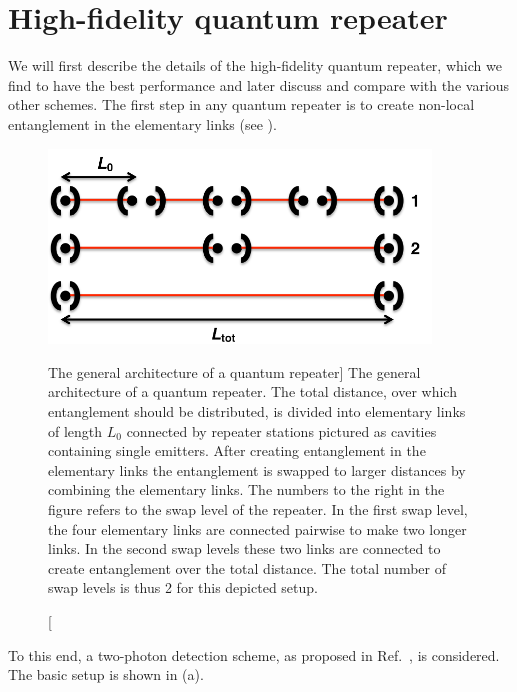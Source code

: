 \section{High-fidelity quantum repeater}  \label{sec:generation}

We will first describe the details of the high-fidelity quantum repeater, which
we find to have the best performance and later discuss and compare with the
various other schemes. The first step in any quantum repeater is to create
non-local entanglement in the elementary links (see ).
\begin{figure} 
\centering
\includegraphics[width=4.0in]{./figs_Borregaard_PRA2015/figure1}
\caption
[The general architecture of a quantum repeater]
{The general architecture of a quantum repeater. The total distance,
over which entanglement should be distributed, is divided into elementary links
of length $L_{0}$ connected by repeater stations pictured as cavities containing
single emitters. After creating entanglement in the elementary links the
entanglement is swapped to larger distances by combining the elementary links.
The numbers to the right in the figure refers to the swap level of the repeater.
In the first swap level, the four elementary links are connected pairwise to
make two longer links. In the second swap levels these two links are connected
to create entanglement over the total distance. The total number of swap levels
is thus 2 for this depicted setup. }
\label{fig:figure1}
\end{figure} 
To this end, a two-photon detection scheme, as proposed in Ref.~\cite{kimble2},
is considered. The basic setup is shown in (a).
